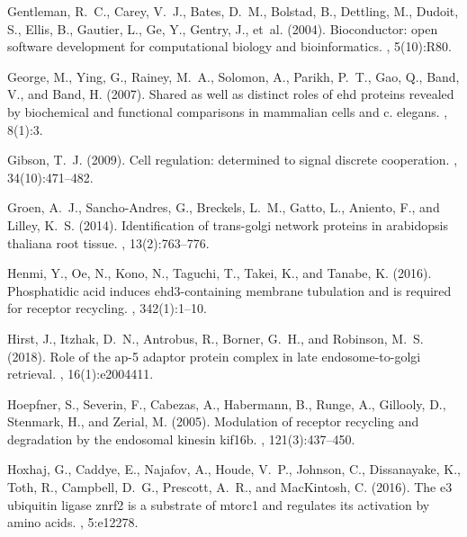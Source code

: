 \documentclass[12pt,english]{article}
\begin{document}
\begin{thebibliography}{}
Gentleman, R.~C., Carey, V.~J., Bates, D.~M., Bolstad, B., Dettling, M.,
  Dudoit, S., Ellis, B., Gautier, L., Ge, Y., Gentry, J., et~al. (2004).
\newblock Bioconductor: open software development for computational biology and
  bioinformatics.
, 5(10):R80.

George, M., Ying, G., Rainey, M.~A., Solomon, A., Parikh, P.~T., Gao, Q., Band,
  V., and Band, H. (2007).
\newblock Shared as well as distinct roles of ehd proteins revealed by
  biochemical and functional comparisons in mammalian cells and c. elegans.
, 8(1):3.

Gibson, T.~J. (2009).
\newblock Cell regulation: determined to signal discrete cooperation.
, 34(10):471--482.

Groen, A.~J., Sancho-Andres, G., Breckels, L.~M., Gatto, L., Aniento, F., and
  Lilley, K.~S. (2014).
\newblock Identification of trans-golgi network proteins in arabidopsis
  thaliana root tissue.
, 13(2):763--776.

Henmi, Y., Oe, N., Kono, N., Taguchi, T., Takei, K., and Tanabe, K. (2016).
\newblock Phosphatidic acid induces ehd3-containing membrane tubulation and is
  required for receptor recycling.
, 342(1):1--10.

Hirst, J., Itzhak, D.~N., Antrobus, R., Borner, G.~H., and Robinson, M.~S.
  (2018).
\newblock Role of the ap-5 adaptor protein complex in late endosome-to-golgi
  retrieval.
, 16(1):e2004411.

Hoepfner, S., Severin, F., Cabezas, A., Habermann, B., Runge, A., Gillooly, D.,
  Stenmark, H., and Zerial, M. (2005).
\newblock Modulation of receptor recycling and degradation by the endosomal
  kinesin kif16b.
, 121(3):437--450.

Hoxhaj, G., Caddye, E., Najafov, A., Houde, V.~P., Johnson, C., Dissanayake,
  K., Toth, R., Campbell, D.~G., Prescott, A.~R., and MacKintosh, C. (2016).
\newblock The e3 ubiquitin ligase znrf2 is a substrate of mtorc1 and regulates
  its activation by amino acids.
, 5:e12278.


\end{thebibliography}
\end{document}
